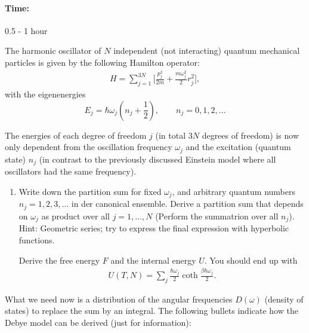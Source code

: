 \documentclass[12pt,a4paper]{article} %
\begin{document}
 \paragraph{Time:} 0.5 - 1 hour
 
The harmonic oscillator of $N$ independent (not interacting) quantum mechanical particles is given by the following Hamilton operator:
\begin{align*}
 H = \sum_{j = 1}^{3 N} \Big[ \frac{p_j^2}{2m} + \frac{m \omega_j^2}{2} r_j^2\Big],
\end{align*} with the eigenenergies
$$E_j = \hbar \omega_j (n_j  + \frac{1}{2})  , \qquad n_{j} = 0,1,2,\dots 
$$

The energies of each degree of freedom $j$ (in total $3N$ degrees of freedom) is now only dependent from the oscillation frequency  $\omega_j$ and the excitation (quantum state) $n_j$ (in contrast to the previously discussed Einstein model where all oscillators had the same frequency).

\begin{enumerate}
  \item Write down the partition sum for fixed $\omega_j$, and arbitrary quantum numbers $n_j = 1,2,3,\dots$ in der canonical ensemble.
  Derive a partition sum that depends on $\omega_j$ as product over all $j = 1, \dots, N$ (Perform the summatrion over all $n_j$).\\
  Hint: Geometric series; try to express the final expression with hyperbolic functions.
  
  Derive the free energy $F$ and the internal energy $U$. You should end up with 
\begin{align}
U(T,N) = \sum_j \frac{\hbar \omega_j}{2} \coth{\frac{\beta \hbar \omega_j}{2}}. \label{equ:internal_energy} 
\end{align}

  
  \end{enumerate}
  What we need now is a distribution of the angular frequencies $D(\omega)$ (density of states) to replace the sum by an integral.
  The following bullets indicate how the Debye model can be derived (just for information):
 
\end{document}
